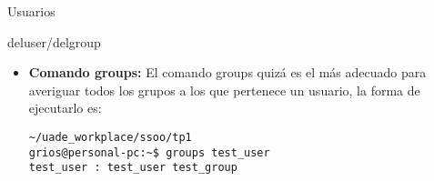 \begin{section}{Usuarios}
\begin{subsection}{deluser/delgroup}
\begin{itemize}
\item \textbf{Comando groups:}
El comando groups quizá es el más adecuado para averiguar todos los grupos a los que pertenece un usuario, la forma de ejecutarlo es:

\begin{lstlisting}[style=Ubuntu]
~/uade_workplace/ssoo/tp1
grios@personal-pc:~$ groups test_user
test_user : test_user test_group
\end{lstlisting}
\end{itemize}

\end{subsection}

\end{section}
